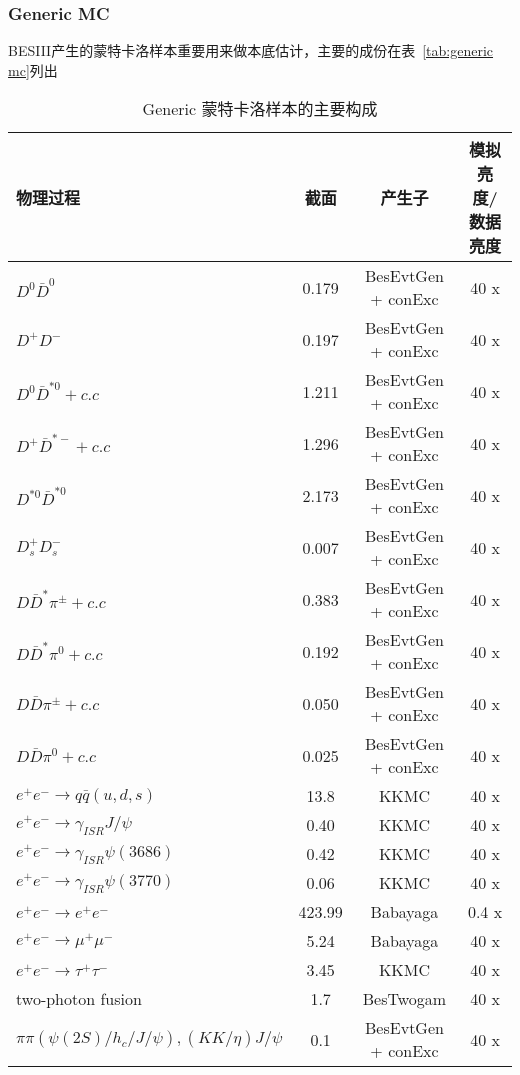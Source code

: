 \subsubsection*{Generic MC}
BESIII产生的蒙特卡洛样本重要用来做本底估计，主要的成份在表~\ref{tab:generic
mc}列出
\begin{table}[htpb]
    \centering
    \caption{Generic 蒙特卡洛样本的主要构成}%
    \label{tab:generic-mc}
    \begin{tabular}{l  c  c  c}
        \toprule 
        物理过程 & 截面  &产生子 & 模拟亮度/数据亮度 \\
        \midrule 
        $D^{0} \bar{D}^{0}$             & 0.179 & BesEvtGen + conExc & 40 x \\
        $D^{+} D^{-}$                   & 0.197 & BesEvtGen + conExc & 40 x \\
        $D^{0} \bar{D}^{*0} + c.c$      & 1.211 & BesEvtGen + conExc & 40 x \\
        $D^{+} \bar{D}^{*-} + c.c$      & 1.296 & BesEvtGen + conExc & 40 x \\
        $D^{*0} \bar{D}^{*0} $          & 2.173 & BesEvtGen + conExc & 40 x \\
        $D_{s}^{+} D_{s}^{-} $          & 0.007 & BesEvtGen + conExc & 40 x \\
        $D \bar{D}^{*}\pi^{\pm} + c.c $ & 0.383 & BesEvtGen + conExc & 40 x \\
        $D \bar{D}^{*}\pi^{0} + c.c $   & 0.192 & BesEvtGen + conExc & 40 x \\
        $D \bar{D}\pi^{\pm} + c.c $     & 0.050 & BesEvtGen + conExc & 40 x \\
        $D \bar{D}\pi^{0} + c.c $       & 0.025 & BesEvtGen + conExc & 40 x \\
        \midrule 
        $e^{+} e^{-} \to q\bar{q}(u, d, s)$ & 13.8 & KKMC & 40 x \\
        \midrule 
        $e^{+}e^{-} \to \gamma_{ISR} J/\psi$     & 0.40 & KKMC & 40 x \\
        $e^{+}e^{-} \to \gamma_{ISR} \psi(3686)$ & 0.42 & KKMC & 40 x \\
        $e^{+}e^{-} \to \gamma_{ISR} \psi(3770)$ & 0.06 & KKMC & 40 x \\
        \midrule 
        $e^{+}e^{-} \to e^{+} e^{-} $       & 423.99 & Babayaga & 0.4 x \\
        $e^{+}e^{-} \to \mu^{+} \mu^{-} $   & 5.24   & Babayaga & 40 x \\
        $e^{+}e^{-} \to \tau^{+} \tau^{-} $ & 3.45   & KKMC & 40 x \\
        \midrule
        two-photon fusion & 1.7 & BesTwogam & 40 x \\
        $\pi \pi (\psi(2S)/h_{c}/J/\psi), (KK/\eta)J/\psi$ & 0.1 & BesEvtGen +
        conExc & 40 x \\
        \bottomrule
    \end{tabular}
\end{table}
